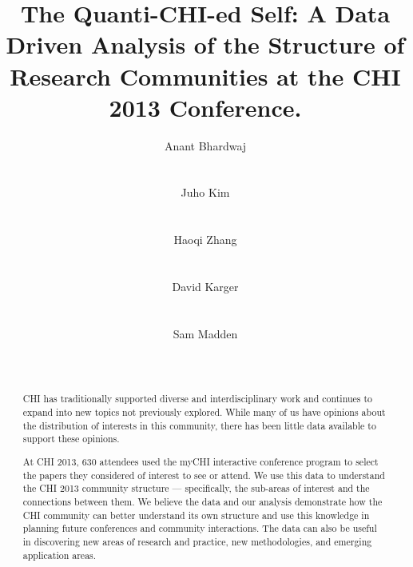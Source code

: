 \documentclass{sigchi}
\begin{document}
\title{The Quanti-CHI-ed Self: A Data Driven Analysis of the Structure of Research Communities at the CHI 2013 Conference.}

\author{
  \alignauthor Anant Bhardwaj\\
    \\
    \\
 \alignauthor Juho Kim\\
    \\
    \\
\alignauthor Haoqi Zhang\\
    \\
    \\
\alignauthor David Karger\\
    \\
    \\
\alignauthor Sam Madden\\
    \\
    \\
}


\maketitle

\begin{abstract}
CHI has traditionally supported diverse and interdisciplinary work and continues to expand into new topics not previously explored.  While many of us have opinions about the distribution of interests in this community, there has been little data available to support these opinions.

At CHI 2013, 630 attendees used the myCHI interactive conference program to select the papers they considered of interest to see or attend.  We use this data to understand the CHI 2013 community structure --- specifically, the sub-areas of interest and the connections between them. We believe the data and our analysis demonstrate how the CHI community can better understand its own structure and use this knowledge in planning future conferences and community interactions. The data can also be useful in discovering new areas of research and practice, new methodologies, and emerging application areas.
\end{abstract}

\end{document}
